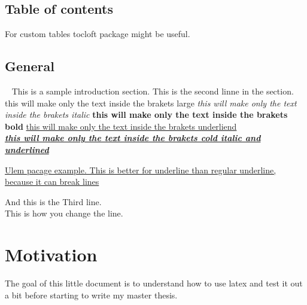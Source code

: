 \documentclass[16pt,a4paper]{article}
\begin{document}
\subsection{Table of contents}
For custom tables tocloft package might be useful.
\subsection{General}~\label{sec:Mysec}
This is a sample introduction section.
This is the second linne in the section.
{\Large this will make only the text inside the brakets large}
\textit{ this will make only the text inside the brakets italic}
\textbf{ this will make only the text inside the brakets bold}
\underline{this will make only the text inside the brakets underliend} \\
\textbf{\textit{\underline{ this will make only the text inside the brakets cold italic and underlined }}}

\uline{Ulem pacage example. This is better for underline than regular underline, because it can break lines}





And this is the Third line. \\
This is how you change the line.

\section{Motivation}
The goal of this little document is to understand how to use latex and test it out a bit before starting to write my master thesis.

\pagebreak
\end{document}
